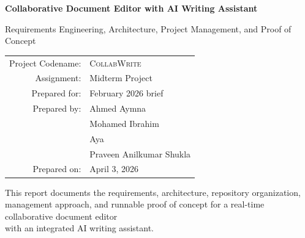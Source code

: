 \documentclass[11pt,a4paper]{article}
\newcommand{\Repo}{\textsc{CollabWrite}}
\newcommand{\PoC}{proof of concept}
\begin{document}
\begin{titlepage}
    \centering
    \vspace*{2.5cm}

    {\Huge\bfseries Collaborative Document Editor with AI Writing Assistant\par}
    \vspace{0.6cm}
    {\Large Requirements Engineering, Architecture, Project Management, and Proof of Concept\par}
    \vspace{1.4cm}

    \begin{tabular}{rl}
        Project Codename: & \Repo \\
        Assignment: & Midterm Project \\
        Prepared for: & February 2026 brief \\
        Prepared by: & Ahmed Aymna \\
        & Mohamed Ibrahim \\
        & Aya \\
        & Praveen Anilkumar Shukla \\
        Prepared on: & April 3, 2026 \\
    \end{tabular}

    \vfill

    {\large
    This report documents the requirements, architecture, repository organization,\\
    management approach, and runnable \PoC{} for a real-time collaborative document editor\\
    with an integrated AI writing assistant.
    \par}

    \vfill
\end{titlepage}

\tableofcontents
\clearpage


\clearpage

\clearpage

\clearpage

\clearpage

\appendix

\end{document}
